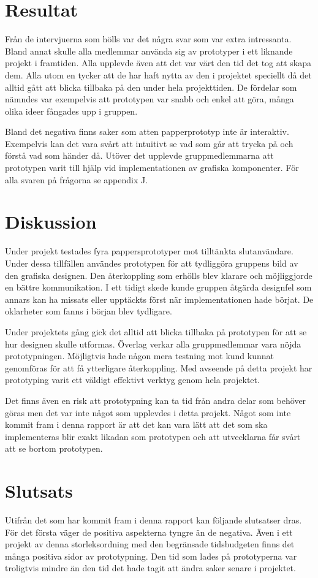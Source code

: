 \section{Resultat}
Från de intervjuerna som hölls var det några svar som var extra intressanta. Bland annat skulle alla medlemmar använda sig av prototyper i ett liknande projekt i framtiden. Alla upplevde även att det var värt den tid det tog att skapa dem. Alla utom en tycker att de har haft nytta av den i projektet speciellt då det alltid gått att blicka tillbaka på den under hela projekttiden. De fördelar som nämndes var exempelvis att prototypen var snabb och enkel att göra, många olika ideer fångades upp i gruppen. 

Bland det negativa finns saker som atten papperprototyp inte är interaktiv. Exempelvis kan det vara svårt att intuitivt se vad som går att trycka på och förstå vad som händer då. Utöver det upplevde gruppmedlemmarna att prototypen varit till hjälp vid implementationen av grafiska komponenter. För alla svaren på frågorna se appendix J.  
  
\section{Diskussion}
Under projekt testades fyra pappersprototyper mot tilltänkta slutanvändare. Under dessa tillfällen användes prototypen för att tydliggöra gruppens bild av den grafiska designen. Den återkoppling som erhölls blev klarare och möjliggjorde en bättre kommunikation. I ett tidigt skede kunde gruppen åtgärda designfel som annars kan ha missats eller upptäckts först när implementationen hade börjat. De oklarheter som fanns i början blev tydligare. 

Under projektets gång gick det alltid att blicka tillbaka på prototypen för att se hur designen skulle utformas. Överlag verkar alla gruppmedlemmar vara nöjda prototypningen. Möjligtvis hade någon mera testning mot kund kunnat genomföras för att få ytterligare återkoppling. Med avseende på detta projekt har prototyping varit ett väldigt effektivt verktyg genom hela projektet. 

Det finns även en risk att prototypning kan ta tid från andra delar som behöver göras men det var inte något som upplevdes i detta projekt. Något som inte kommit fram i denna rapport är att det kan vara lätt att det som ska implementeras blir exakt likadan som prototypen och att utvecklarna får svårt att se bortom prototypen.       

\section{Slutsats}
Utifrån det som har kommit fram i denna rapport kan följande slutsatser dras. För det första väger de positiva aspekterna tyngre än de negativa. Även i ett projekt av denna storleksordning med den begränsade tidsbudgeten finns det många positiva sidor av prototypning. Den tid som lades på prototyperna var troligtvis mindre än den tid det hade tagit att ändra saker senare i projektet. 

